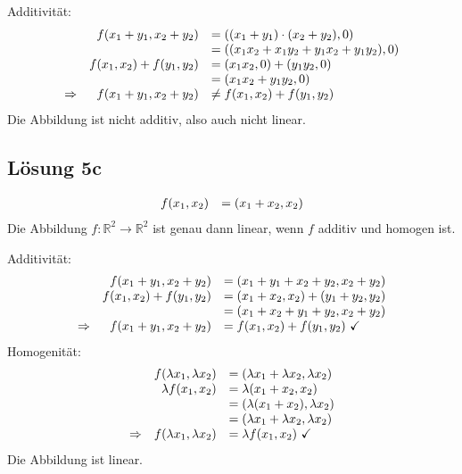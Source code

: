 \documentclass[main.tex]{subfiles}
\begin{document}
Additivität:
\begin{equation*}
    \begin{array}{ r r l }
    & f( x_{1} +y_{1} ,x_{2} +y_{2}) & =(( x_{1} +y_{1}) \cdotp ( x_{2} +y_{2}) ,0)\\
    &  & =(( x_{1} x_{2} +x_{1} y_{2} +y_{1} x_{2} +y_{1} y_{2}) ,0)\\
    & f( x_{1} ,x_{2}) +f( y_{1} ,y_{2}) & =( x_{1} x_{2} ,0) +( y_{1} y_{2} ,0)\\
    &  & =( x_{1} x_{2} +y_{1} y_{2} ,0)\\
    \Rightarrow  & f( x_{1} +y_{1} ,x_{2} +y_{2}) & \neq f( x_{1} ,x_{2}) +f( y_{1} ,y_{2})
    \end{array}
\end{equation*}
Die Abbildung ist nicht additiv, also auch nicht linear.

\subsection{Lösung 5c}
\begin{equation*}
    \begin{array}{ r l }
    f( x_{1} ,x_{2}) & =( x_{1} +x_{2} ,x_{2})
    \end{array}
\end{equation*}
Die Abbildung $f:\mathbb{R}^{2}\rightarrow \mathbb{R}^{2}$ ist genau dann linear, wenn $f$ additiv und homogen ist.

Additivität:
\begin{equation*}
    \begin{array}{ r r l }
    & f( x_{1} +y_{1} ,x_{2} +y_{2}) & =( x_{1} +y_{1} +x_{2} +y_{2} ,x_{2} +y_{2})\\
    & f( x_{1} ,x_{2}) +f( y_{1} ,y_{2}) & =( x_{1} +x_{2} ,x_{2}) +( y_{1} +y_{2} ,y_{2})\\
    &  & =( x_{1} +x_{2} +y_{1} +y_{2} ,x_{2} +y_{2})\\
    \Rightarrow  & f( x_{1} +y_{1} ,x_{2} +y_{2}) & =f( x_{1} ,x_{2}) +f( y_{1} ,y_{2}) \ \checked
    \end{array}
\end{equation*}
Homogenität:
\begin{equation*}
    \begin{array}{ r r l }
    & f( \lambda x_{1} ,\lambda x_{2}) & =( \lambda x_{1} +\lambda x_{2} ,\lambda x_{2})\\
    & \lambda f( x_{1} ,x_{2}) & =\lambda ( x_{1} +x_{2} ,x_{2})\\
    &  & =( \lambda ( x_{1} +x_{2}) ,\lambda x_{2})\\
    &  & =( \lambda x_{1} +\lambda x_{2} ,\lambda x_{2})\\
    \Rightarrow  & f( \lambda x_{1} ,\lambda x_{2}) & =\lambda f( x_{1} ,x_{2}) \ \checked
    \end{array}
\end{equation*}
Die Abbildung ist linear.
\end{document}
